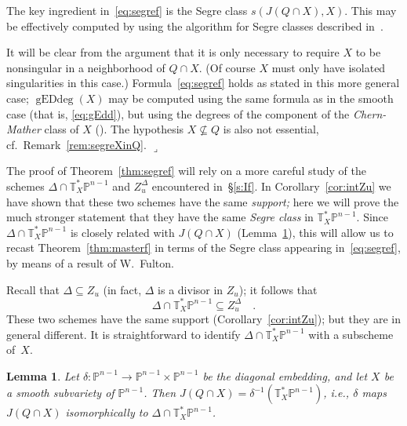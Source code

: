 \documentclass[11pt]{amsart}
\newtheorem{lemma}[theorem]{Lemma}
\numberwithin{equation}{section}
\newcommand{\Pbb}{{\mathbb{P}}}
\newcommand{\Tbb}{{\mathbb{T}}}
\DeclareMathOperator{\gEdd}{gEDdeg}
\newcommand{\qede}{\hfill$\lrcorner$}
\begin{document}
The key ingredient in~\eqref{eq:segref} is the Segre class $s(J(Q\cap X), X)$. This may
be effectively computed by using the algorithm for Segre classes described 
in~\cite{Harris201726}. 

\begin{remark}\label{rem:Xsin}
It will be clear from the argument that it is only necessary to require $X$ to be
nonsingular in a neighborhood of $Q\cap X$.
(Of course $X$ must only have isolated singularities in this case.)
Formula~\eqref{eq:segref} holds
as stated in this more general case; $\gEdd(X)$ may be computed using the 
same formula as in the smooth case (that is, \eqref{eq:gEdd}), but using the 
degrees of the component of the {\em Chern-Mather\/} class of $X$
(\cite[Proposition~2.9]{produa}). The hypothesis $X\not\subseteq Q$ is also not
essential, cf.~Remark~\ref{rem:segreXinQ}.
\qede\end{remark}

The proof of Theorem~\ref{thm:segref} will rely on a more careful study of the schemes
$\Delta\cap \Tbb^*_X\Pbb^{n-1}$ and $Z^\Delta_u$ encountered in~\S\ref{s:If}.
In Corollary~\ref{cor:intZu} we have shown that these two schemes have the
same {\em support;\/} here we will prove the much stronger statement that they
have the same {\em Segre class\/} in $\Tbb^*_X\Pbb^{n-1}$.
Since $\Delta\cap \Tbb^*_X\Pbb^{n-1}$ is closely related with $J(Q\cap X)$
(Lemma~\ref{lem:Delta}), this will allow us to recast Theorem~\ref{thm:masterf}
in terms of the Segre class appearing in~\eqref{eq:segref}, by means of a result
of W.~Fulton.

Recall that $\Delta\subseteq Z_u$ (in fact, $\Delta$ is a divisor in $Z_u$); it follows that
\[
\Delta\cap \Tbb^*_X\Pbb^{n-1} \subseteq Z^\Delta_u\quad.
\] 
These two schemes have the same support (Corollary~\ref{cor:intZu}); but they are in 
general different. It is straightforward to identify 
$\Delta\cap \Tbb^*_X\Pbb^{n-1}$ with a subscheme of~$X$.

\begin{lemma}\label{lem:Delta}
Let $\delta: \Pbb^{n-1}\to \Pbb^{n-1}\times \Pbb^{n-1}$ be the diagonal embedding, and 
let $X$ be a smooth subvariety of $\Pbb^{n-1}$. 
Then $J(Q\cap X) =\delta^{-1}(\Tbb^*_X\Pbb^{n-1})$, i.e., $\delta$ maps $J(Q\cap X)$
isomorphically to $\Delta\cap \Tbb^*_X\Pbb^{n-1}$.
\end{lemma}
\end{document}
